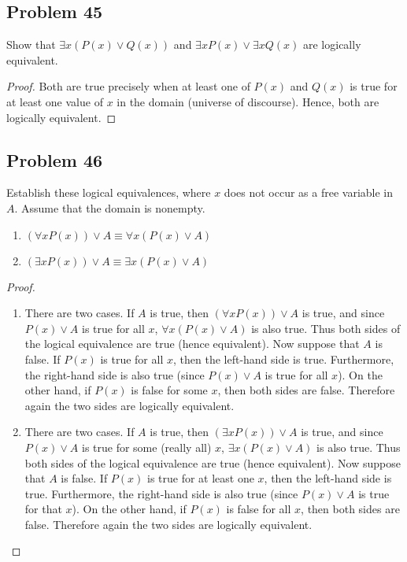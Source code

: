 \documentclass{article}
\begin{document}
\subsection*{Problem 45}
Show that $\exists x(P(x) \lor Q(x))$ and $\exists xP(x) \lor \exists xQ(x)$ are logically equivalent.

\begin{proof}
Both are true precisely when at least one of $P(x)$ and $Q(x)$ is true for at least one value of $x$ in the domain (universe of discourse). Hence, both are logically equivalent.
\end{proof}

\clearpage
\subsection*{Problem 46}
Establish these logical equivalences, where $x$ does not occur as a free variable in $A$. Assume that the domain is nonempty.

\begin{enumerate}[leftmargin=16pt, topsep = 8pt]
\item $(\forall xP(x)) \lor A \equiv \forall x(P(x) \lor A)$
\item $(\exists xP(x)) \lor A \equiv \exists x(P(x) \lor A)$
\end{enumerate}

\begin{proof}
\hspace{1pt}

\begin{enumerate}[leftmargin=16pt, topsep = 8pt]
\item There are two cases. If $A$ is true, then $(\forall xP(x)) \lor A$ is true, and since $P(x) \lor A$ is true for all $x$, $\forall x(P(x) \lor A)$ is also true. Thus both sides of the logical equivalence are true (hence equivalent). Now suppose that $A$ is false. If $P(x)$ is true for all $x$, then the left-hand side is true. Furthermore, the right-hand side is also true (since $P(x) \lor A$ is true for all $x$). On the other hand, if $P(x)$ is false for some $x$, then both sides are false. Therefore again the two sides are logically equivalent.
\item There are two cases. If $A$ is true, then $(\exists xP(x)) \lor A$ is true, and since $P(x) \lor A$ is true for some (really all) $x$, $\exists x(P(x) \lor A)$ is also true. Thus both sides of the logical equivalence are true (hence equivalent). Now suppose that $A$ is false. If $P(x)$ is true for at least one $x$, then the left-hand side is true. Furthermore, the right-hand side is also true (since $P(x) \lor A$ is true for that $x$). On the other hand, if $P(x)$ is false for all $x$, then both sides are false. Therefore again the two sides are logically equivalent.
\end{enumerate}
\end{proof}
\end{document}
